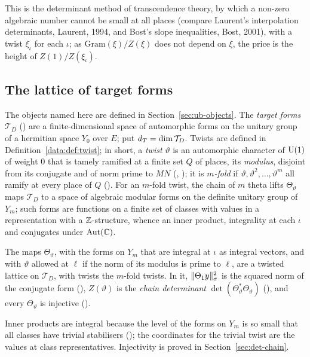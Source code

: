 \begin{remark}
This is the determinant method of transcendence theory, by which a non-zero algebraic number
cannot be small at all places (compare Laurent's interpolation determinants, Laurent, 1994, and Bost's slope
inequalities, Bost, 2001), with a twist $\xi_\iota$ for each $\iota$; as
$\mathrm{Gram}(\xi)/Z(\xi)$ does not depend on $\xi$, the price is the height of $Z(1)/Z(\xi_\iota)$.
\end{remark}

\subsection{The lattice of target forms}

The objects named here are defined in Section~\ref{sec:ub-objects}. The \emph{target forms}
$\mathcal{T}_D$ () are a finite-dimensional space of automorphic forms
on the unitary group of a hermitian space $Y_0$ over $E$; put $d_T = \dim \mathcal{T}_D$. Twists are
defined in Definition~\ref{data:def:twist}; in short, a
\emph{twist} $\vartheta$ is an automorphic character of $\operatorname{U}(1)$ of weight $0$ that is tamely
ramified at a finite set $Q$ of places, its \emph{modulus}, disjoint from its conjugate and of norm
prime to $MN$ (, ); it is \emph{$m$-fold} if
$\vartheta, \vartheta^2, \dots, \vartheta^m$ all ramify at every place of $Q$
(). For an $m$-fold twist, the chain of $m$ theta lifts
$\Theta_\vartheta$ maps $\mathcal{T}_D$ to a space of algebraic modular forms on the definite
unitary group of $Y_m$; such forms are functions on a finite set of classes with values in a
representation with a $\mathbb{Z}$-structure, whence an inner product, integrality at each $\iota$ and
conjugates under $\operatorname{Aut}(\mathbb{C})$.

\begin{proposition}\label{setup:prop:targetlattice}
The maps $\Theta_\vartheta$, with the forms on $Y_m$ that are integral at $\iota$ as integral
vectors, and with $\vartheta$ allowed at $\ell$ if the norm of its modulus is prime to $\ell$, are
a twisted lattice on $\mathcal{T}_D$, with twists the $m$-fold twists. In it,
$\lVert\Theta_1 y\rVert_\sigma^2$ is the squared norm of the conjugate form
(), $Z(\vartheta)$ is the \emph{chain determinant}
$\det(\Theta_\vartheta^*\Theta_\vartheta)$ (), and every
$\Theta_\vartheta$ is injective ().
\end{proposition}

Inner products are integral because the level of the forms on $Y_m$ is so small that all classes
have trivial stabilisers (); the coordinates for
the trivial twist are the values at class representatives. Injectivity is proved in
Section~\ref{sec:det-chain}.
